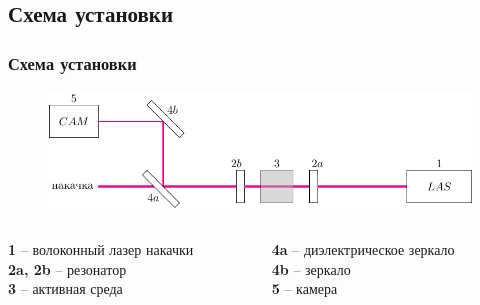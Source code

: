 \documentclass[10pt,pdf,hyperref={unicode}, dvipsnames]{beamer}
\newcommand\frametitless[1]{\subsection{#1}\frametitle{#1}}
\begin{document}
\begin{frame}
	\frametitless{Схема установки}
	\begin{figure}[tb]
		\centering
		\includegraphics[width=1\textwidth]{images/chem}
	\end{figure}
	\vspace{1cm}
	\begin{columns}
		\begin{column}{0.4\textwidth}
			\textbf{1} -- волоконный лазер накачки\\ 
			\textbf{2a, 2b} -- резонатор\\
			\textbf{3} -- активная среда
		\end{column}
		\begin{column}{0.4\textwidth}
			\textbf{4a} -- диэлектрическое зеркало\\
			\textbf{4b} -- зеркало\\
			\textbf{5} -- камера
		\end{column}
	\end{columns}
\end{frame}
\end{document}
